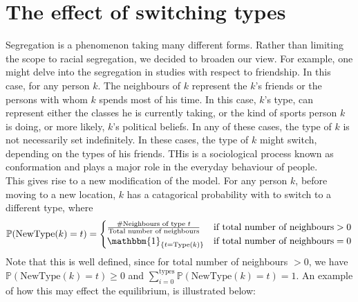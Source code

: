 \section{The effect of switching types}
\label{section:switch}
Segregation is a phenomenon taking many different forms. Rather than  limiting the scope to racial segregation, we decided to broaden our view. 
For example, one might delve into the segregation in studies with respect to friendship. 
In this case, for any person \(k\). The neighbours of \(k\) represent the \(k\)'s friends or the persons with whom \(k\) spends most of his time.
In this case, \(k\)'s type, can represent either the classes he is currently taking, or the kind of sports person \(k\) is doing, or more likely, \(k\)'s political beliefs.
In any of these cases, the type of \(k\) is not necessarily set indefinitely.
In these cases, the type of \(k\) might switch, depending on the types of his friends. THis is a sociological process known as conformation and plays a major role in the everyday behaviour of people.\\

This gives rise to a new modification of the model.
For any person \(k\), before moving to a new location, \(k\) has a catagorical probability with to switch to a different type, where 
\[\mathbb{P}(\text{NewType}(k)=t) = \begin{cases} 
 \frac{\#\text{Neighbours of type }t}{\text{Total number of neighbours}}	&\mbox{if } \text{total number of neighbours}>0 \\ 
\mathbbm{1}_{\{t=\text{Type}(k)\}}   &\mbox{if } \text{total number of neighbours}=0
\end{cases}\]
Note that this is well defined, since for total number of neighbours \(> 0\), we have \( \mathbb{P}(\text{NewType}(k)=t) \geq 0\) and \(\sum_{i=0}^{\text{types}}\mathbb{P}(\text{NewType}(k)=t)=1\). An example of how this may effect the equilibrium, is illustrated below:

